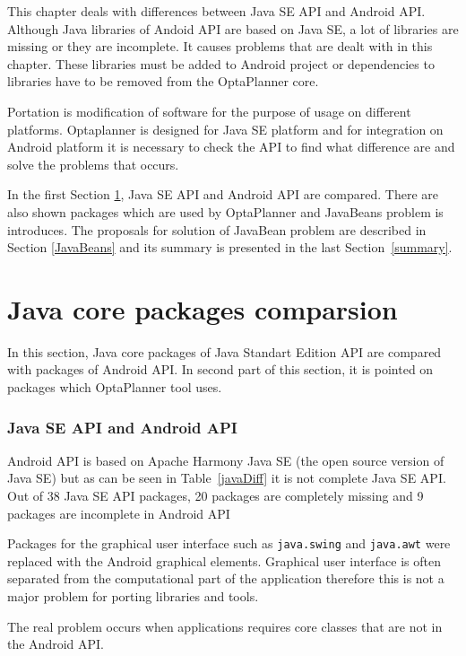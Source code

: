 This chapter deals with differences between Java SE API and Android API. Although Java libraries of Andoid API are based on Java SE, a lot of libraries are missing or they are incomplete. It causes problems that are dealt with in this chapter. These libraries must be added to Android project or dependencies to libraries have to be removed from the OptaPlanner core.

Portation is modification of software for the purpose of usage on different platforms. Optaplanner is designed for Java SE platform and for integration on Android platform it is necessary to check the API to find what difference are and solve the problems that occurs.

In the first Section \ref{comparsion}, Java SE API and Android API are compared. There are also shown packages which are used by OptaPlanner and JavaBeans problem is introduces. The proposals for solution of JavaBean problem are described in Section \ref{JavaBeans} and its summary is presented in the last Section~\ref{summary}.

\section{Java core packages comparsion}\label{comparsion}
In this section, Java core packages of Java Standart Edition API are compared with packages of Android API. In second part of this section, it is pointed on packages which OptaPlanner tool uses.

\subsubsection{Java SE API and Android API}\label{apis}
Android API is based on Apache Harmony Java SE \cite{Apache} (the open source version of Java SE) but as can be seen in Table~\ref{javaDiff} it is not complete Java SE API. Out of 38 Java SE API packages, 20 packages are completely missing and 9 packages are incomplete in Android API

Packages for the graphical user interface such as \texttt{java.swing} and \texttt{java.awt} were replaced with the Android graphical elements. Graphical user interface is often separated from the computational part of the application therefore this is not a major problem for porting libraries and tools.

The real problem occurs when applications requires core classes that are not in the Android API.

